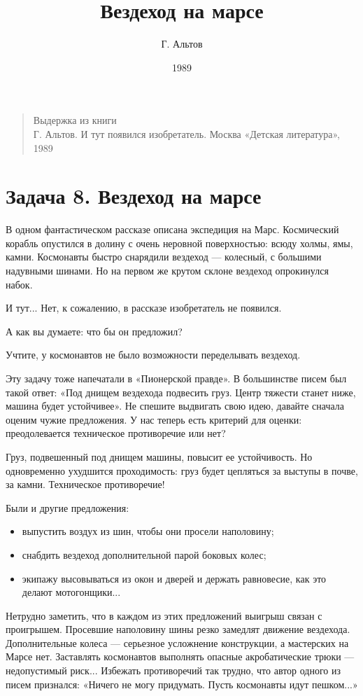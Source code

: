 \documentclass[11pt,a4paper]{article}
\title{Вездеход на марсе}
\author{Г. Альтов}
\date{1989}
\begin{document}
\maketitle

\begin{quote}
  Выдержка из книги\\
  Г. Альтов.  И тут появился изобретатель.  Москва «Детская литература», 1989
\end{quote}

\section*{Задача 8. Вездеход на марсе}

В одном фантастическом рассказе описана экспедиция на Марс. Космический
корабль опустился в долину с очень неровной поверхностью: всюду холмы, ямы,
камни. Космонавты быстро снарядили вездеход — колесный, с большими надувными
шинами. Но на первом же крутом склоне вездеход опрокинулся набок.

И тут... Нет, к сожалению, в рассказе изобретатель не появился.

А как вы думаете: что бы он предложил?

Учтите, у космонавтов не было возможности переделывать вездеход.

Эту задачу тоже напечатали в «Пионерской правде». В большинстве писем был
такой ответ: «Под днищем вездехода подвесить груз. Центр тяжести станет ниже,
машина будет устойчивее». Не спешите выдвигать свою идею, давайте сначала
оценим чужие предложения. У нас теперь есть критерий для оценки:
преодолевается техническое противоречие или нет?

Груз, подвешенный под днищем машины, повысит ее устойчивость. Но одновременно
ухудшится проходимость: груз будет цепляться за выступы в почве, за камни.
Техническое противоречие!

Были и другие предложения:
\begin{itemize}[noitemsep]
\item выпустить воздух из шин, чтобы они просели наполовину;
\item снабдить вездеход дополнительной парой боковых колес;
\item экипажу высовываться из окон и дверей и держать равновесие, как это
  делают мотогонщики...
\end{itemize}
Нетрудно заметить, что в каждом из этих предложений выигрыш связан с
проигрышем. Просевшие наполовину шины резко замедлят движение вездехода.
Дополнительные колеса — серьезное усложнение конструкции, а мастерских на
Марсе нет. Заставлять космонавтов выполнять опасные акробатические трюки —
недопустимый риск...  Избежать противоречий так трудно, что автор одного из
писем признался: «Ничего не могу придумать. Пусть космонавты идут пешком...»
\end{document}
